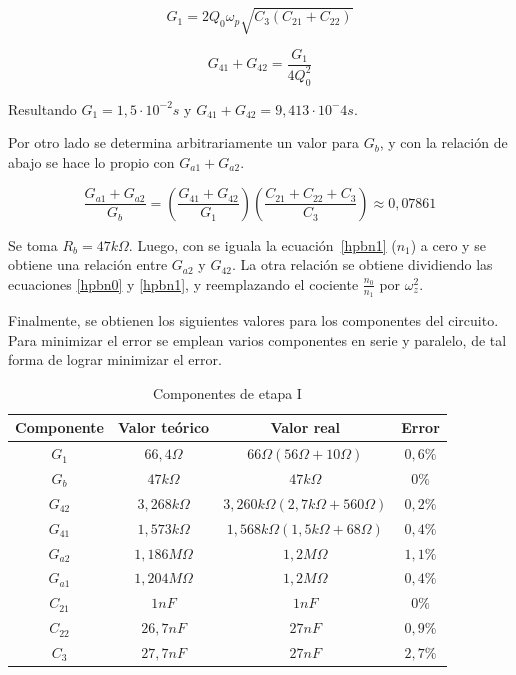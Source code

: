 \begin{equation}
\label{g1}
G_1 = 2Q_0\omega_p\sqrt{C_3\left(C_{21}+C_{22}\right)}
\end{equation}

\begin{equation}
\label{g41+g42}
G_{41} + G_{42} = \frac{G_1}{4Q_0^2}
\end{equation}

Resultando $G_1 = 1,5 \cdot 10^{-2}s$ y $G_{41}+G_{42}=9,413\cdot 10^-4s$.

Por otro lado se determina arbitrariamente un valor para $G_b$, y con la relaci\'on de abajo se hace lo propio con $G_{a1} + G_{a2}$.

\begin{equation}
\frac{G_{a1} + G_{a2}}{G_b} = \left( \frac{G_{41}+G_{42}}{G_1}\right) \left( \frac{C_{21}+C_{22}+C_3}{C_3}\right) \approx 0,07861
\end{equation}

Se toma $R_b = 47k\Omega$. Luego, con se iguala la ecuaci\'on~\ref{hpbn1} ($n_1$) a cero y se obtiene una relaci\'on entre $G_{a2}$ y $G_{42}$. La otra relaci\'on se obtiene dividiendo las ecuaciones \ref{hpbn0} y \ref{hpbn1}, y reemplazando el cociente $\frac{n_0}{n_1}$ por $\omega_z^2$.



Finalmente, se obtienen los siguientes valores para los componentes del circuito. Para minimizar el error se emplean varios componentes en serie y paralelo, de tal forma de lograr minimizar el error.


\begin{table}[H]
    \centering
    \begin{tabular}{c c c c}
        Componente & Valor te\'orico & Valor real & Error\\
        \hline
         $G_1$ & $66,4\Omega$ & $66\Omega (56\Omega + 10\Omega)$ & $0,6\%$ \\
	     $G_b$ & $47k\Omega$ & $47k\Omega$ & $0\%$ \\
         $G_{42}$ & $3,268k\Omega$ & $3,260k\Omega (2,7k\Omega + 560\Omega)$ & $0,2\%$ \\
         $G_{41}$ & $1,573k\Omega$ & $1,568k\Omega (1,5k\Omega+68\Omega)$ & $0,4\%$ \\
         $G_{a2}$ & $1,186M\Omega$ & $1,2M\Omega$ & $1,1\%$ \\
	     $G_{a1}$ & $1,204M\Omega$ & $1,2M\Omega$ & $0,4\%$ \\
         $C_{21}$ & $1nF$ & $1nF$ & $0\%$ \\
         $C_{22}$ & $26,7nF$ & $27nF$ & $0,9\%$ \\
         $C_3$ & $27,7nF$ & $27nF$ & $2,7\%$ \\
    \end{tabular}
    \caption{Componentes de etapa I}
    \label{tabla_stageI_comp}
\end{table}

